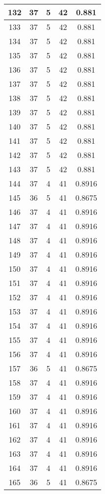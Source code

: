 \documentclass[letterpaper, 12pt]{article}
\begin{document}
\begin{longtable}{|c|c|c|c|c|}
\hline
132 & 37 & 5 & 42 & 0.881 \\
\hline
133 & 37 & 5 & 42 & 0.881 \\
\hline
134 & 37 & 5 & 42 & 0.881 \\
\hline
135 & 37 & 5 & 42 & 0.881 \\
\hline
136 & 37 & 5 & 42 & 0.881 \\
\hline
137 & 37 & 5 & 42 & 0.881 \\
\hline
138 & 37 & 5 & 42 & 0.881 \\
\hline
139 & 37 & 5 & 42 & 0.881 \\
\hline
140 & 37 & 5 & 42 & 0.881 \\
\hline
141 & 37 & 5 & 42 & 0.881 \\
\hline
142 & 37 & 5 & 42 & 0.881 \\
\hline
143 & 37 & 5 & 42 & 0.881 \\
\hline
144 & 37 & 4 & 41 & 0.8916 \\
\hline
145 & 36 & 5 & 41 & 0.8675 \\
\hline
146 & 37 & 4 & 41 & 0.8916 \\
\hline
147 & 37 & 4 & 41 & 0.8916 \\
\hline
148 & 37 & 4 & 41 & 0.8916 \\
\hline
149 & 37 & 4 & 41 & 0.8916 \\
\hline
150 & 37 & 4 & 41 & 0.8916 \\
\hline
151 & 37 & 4 & 41 & 0.8916 \\
\hline
152 & 37 & 4 & 41 & 0.8916 \\
\hline
153 & 37 & 4 & 41 & 0.8916 \\
\hline
154 & 37 & 4 & 41 & 0.8916 \\
\hline
155 & 37 & 4 & 41 & 0.8916 \\
\hline
156 & 37 & 4 & 41 & 0.8916 \\
\hline
157 & 36 & 5 & 41 & 0.8675 \\
\hline
158 & 37 & 4 & 41 & 0.8916 \\
\hline
159 & 37 & 4 & 41 & 0.8916 \\
\hline
160 & 37 & 4 & 41 & 0.8916 \\
\hline
161 & 37 & 4 & 41 & 0.8916 \\
\hline
162 & 37 & 4 & 41 & 0.8916 \\
\hline
163 & 37 & 4 & 41 & 0.8916 \\
\hline
164 & 37 & 4 & 41 & 0.8916 \\
\hline
165 & 36 & 5 & 41 & 0.8675 \\

\end{longtable}
\end{document}
